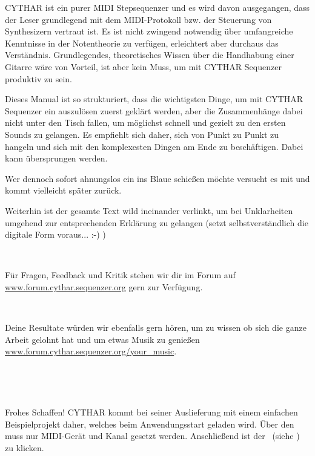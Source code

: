 \documentclass[10pt,final,a4paper]{report}
\begin{document}
\newcommand{\TITLEdragndrop}{\textbf{Drag'n'Drop}}
\newcommand{\TITLEshortcut}{\textbf{Shortcuts}}

%
%
%
%
%
CYTHAR ist ein purer MIDI Stepsequenzer und es wird davon ausgegangen, dass der Leser grundlegend mit dem MIDI-Protokoll bzw. der Steuerung von Synthesizern vertraut ist. Es ist nicht zwingend notwendig über umfangreiche Kenntnisse in der Notentheorie zu verfügen, erleichtert aber durchaus das Verständnis. Grundlegendes, theoretisches Wissen über die Handhabung einer Gitarre wäre von Vorteil, ist aber kein Muss, um mit CYTHAR Sequenzer produktiv zu sein.


Dieses Manual ist so strukturiert, dass die wichtigsten Dinge, um mit CYTHAR Sequenzer ein  auszulösen zuerst geklärt werden, aber die Zusammenhänge dabei nicht unter den Tisch fallen, um möglichst schnell und gezielt zu den ersten Sounds zu gelangen. Es empfiehlt sich daher, sich von Punkt zu Punkt zu hangeln und sich mit den komplexesten Dingen am Ende zu beschäftigen.  Dabei kann  übersprungen werden.

Wer dennoch sofort ahnungslos ein  ins Blaue schießen möchte versucht es mit  und kommt vielleicht später zurück.

Weiterhin ist der gesamte Text wild ineinander verlinkt, um bei Unklarheiten umgehend zur entsprechenden Erklärung zu gelangen (setzt selbstverständlich die digitale Form voraus... :-) )

~

Für Fragen, Feedback und Kritik stehen wir dir im Forum auf \url{www.forum.cythar.sequenzer.org} gern zur Verfügung.

~

Deine Resultate würden wir ebenfalls gern hören, um zu wissen ob sich die ganze Arbeit gelohnt hat und um etwas Musik zu genießen \url{www.forum.cythar.sequenzer.org/your_music}.

~

~

Frohes Schaffen!
%
%
%
%
%
%
CYTHAR kommt bei seiner Auslieferung mit einem einfachen Beispielprojekt daher, welches beim Anwendungsstart geladen wird. Über den  muss nur MIDI-Gerät und Kanal gesetzt werden. Anschließend ist der \playbutton~(siehe ) zu klicken.
\end{document}
